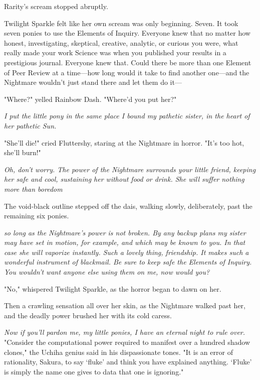 Rarity's scream stopped abruptly.

Twilight Sparkle felt like her own scream was only beginning. Seven. It took
seven ponies to use the Elements of Inquiry. Everyone knew that no matter how
honest, investigating, skeptical, creative, analytic, or curious you were, what
really made your work Science was when you published your results in a
prestigious journal. Everyone knew that. Could there be more than one Element
of Peer Review at a time---how long would it take to find another one---and the
Nightmare wouldn't just stand there and let them do it---

"Where?" yelled Rainbow Dash. "Where'd you put her?"

\emph{I put the little pony in the same place I bound my pathetic sister, in
the heart of her pathetic Sun.}

"She'll die!" cried Fluttershy, staring at the Nightmare in horror. "It's too
hot, she'll burn!"

\emph{Oh, don't worry. The power of the Nightmare surrounds your little friend,
keeping her safe and cool, sustaining her without food or drink. She will
suffer nothing more than boredom{\el}}

The void-black outline stepped off the dais, walking slowly, deliberately, past
the remaining six ponies.

\emph{{\el}so long as the Nightmare's power is not broken. By any backup
plans my sister may have set in motion, for example, and which may be known to
you. In that case she will vaporize instantly. Such a lovely thing, friendship.
It makes such a wonderful instrument of blackmail. Be sure to keep safe the
Elements of Inquiry. You wouldn't want anyone else using them on me, now would
you?}

"No," whispered Twilight Sparkle, as the horror began to dawn on her.

Then a crawling sensation all over her skin, as the Nightmare walked past her,
and the deadly power brushed her with its cold caress.

\emph{Now if you'll pardon me, my little ponies, I have an eternal night to
rule over.}
\sbreak%
"Consider the computational power required to manifest over a hundred shadow
clones," the Uchiha genius said in his dispassionate tones. "It is an error of
rationality, Sakura, to say `fluke' and think you have explained anything.
`Fluke' is simply the name one gives to data that one is ignoring."

